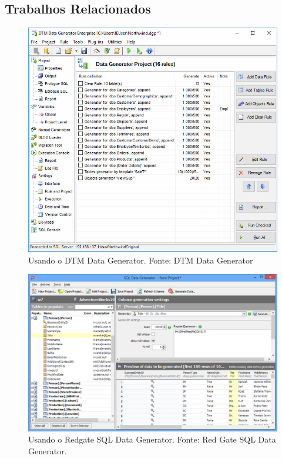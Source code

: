 \documentclass[
	12pt,				%
	openright,			%
	twoside,			%
	a4paper,			%
	english,			%
	brazil				%
	]{abntex2}
\begin{document}
	\subsection{Trabalhos Relacionados}
	\begin{figure}
		\includegraphics[width=\linewidth]{./figures/TrabalhosRelacionados/DTMDataGenerator.png}
		\caption{Usando o DTM Data Generator. Fonte: DTM Data Generator}
		\label{fig:DTMDG}
	\end{figure}
	\begin{figure}
		\includegraphics[width=\linewidth]{./figures/TrabalhosRelacionados/sql-data-generator.png}
		\caption{Usando o Redgate SQL Data Generator. Fonte: Red Gate SQL Data Generator.}
		\label{fig:RedgateSQLDG}
	\end{figure}
\end{document}
